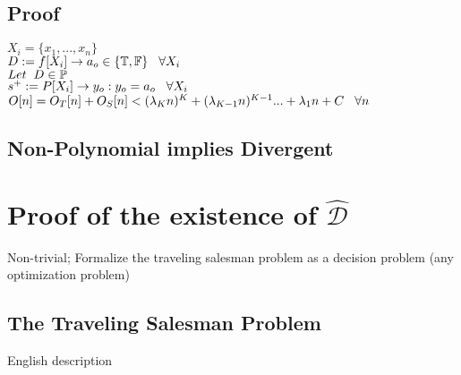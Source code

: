 \documentclass[11pt]{article}
\begin{document}
\subsection{Proof}
\begin{center}
$
X_i = \{x_1,...,x_n\}
$
\\ \vspace{2mm}
$
D := f \lbrack X_i \rbrack \rightarrow a_{o} \in \{\mathbb{T}, \mathbb{F}\} \hspace{3mm} \forall X_i
$
\\ \vspace{6mm}
$
Let \hspace{2mm} D \in \mathbb{P}
$
\\ \vspace{2mm}
$
s^+ := P \lbrack X_i \rbrack \rightarrow y_{o} : y_o = a_{o} \hspace{3mm} \forall X_i
$
\\ \vspace{2mm}
$
O[n] = O_T[n] + O_S[n] < (\lambda_K n)^K + (\lambda_{K-1} n)^{K-1}... + \lambda_1 n + C \hspace{3mm} \forall n
$
\end{center}

\subsection{Non-Polynomial implies Divergent}




















\newpage
\section{Proof of the existence of $\hat{\mathcal{D}}$}
Non-trivial; Formalize the traveling salesman problem as a decision problem (any optimization problem)

\subsection{The Traveling Salesman Problem}
English description
\end{document}
